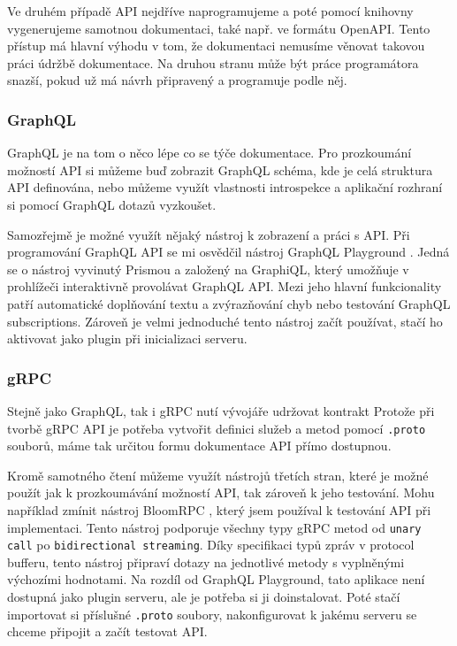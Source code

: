 \documentclass[thesis=M,czech]{FITthesis}[2019/12/23]
\begin{document}
Ve druhém případě API nejdříve naprogramujeme a poté pomocí knihovny vygenerujeme samotnou dokumentaci, také např. ve formátu OpenAPI. Tento přístup má hlavní výhodu v tom, že dokumentaci nemusíme věnovat takovou práci údržbě dokumentace. Na druhou stranu může být práce programátora snazší, pokud už má návrh připravený a programuje podle něj.

\subsubsection*{GraphQL}
GraphQL je na tom o něco lépe co se týče dokumentace. Pro prozkoumání možností API si můžeme buď zobrazit GraphQL schéma, kde je celá struktura API definována, nebo můžeme využít vlastnosti introspekce a aplikační rozhraní si pomocí GraphQL dotazů vyzkoušet.

Samozřejmě je možné využít nějaký nástroj k zobrazení a práci s API. Při programování GraphQL API se mi osvědčil nástroj GraphQL Playground \cite{apollo_playground}. 
Jedná se o nástroj vyvinutý Prismou a založený na GraphiQL, který umožňuje v prohlížeči interaktivně provolávat GraphQL API. Mezi jeho hlavní funkcionality patří automatické doplňování textu a zvýrazňování chyb nebo testování GraphQL subscriptions. Zároveň je velmi jednoduché tento nástroj začít používat, stačí ho aktivovat jako plugin při inicializaci serveru.


\subsubsection*{gRPC}
Stejně jako GraphQL, tak i gRPC nutí vývojáře udržovat kontrakt 
Protože při tvorbě gRPC API je potřeba vytvořit definici služeb a metod pomocí \texttt{.proto} souborů, máme tak určitou formu dokumentace API přímo dostupnou.

Kromě samotného čtení můžeme využít nástrojů třetích stran, které je možné použít jak k prozkoumávání možností API, tak zároveň k jeho testování. Mohu například zmínit nástroj BloomRPC \cite{bloomrpc}, který jsem používal k testování API při implementaci. Tento nástroj podporuje všechny typy gRPC metod od \texttt{unary call} po \texttt{bidirectional streaming}. Díky specifikaci typů zpráv v protocol bufferu, tento nástroj připraví dotazy na jednotlivé metody s vyplněnými výchozími hodnotami. Na rozdíl od GraphQL Playground, tato aplikace není dostupná jako plugin serveru, ale je potřeba si ji doinstalovat. Poté stačí importovat si příslušné \texttt{.proto} soubory, nakonfigurovat k jakému serveru se chceme připojit a začít testovat API.
\end{document}

